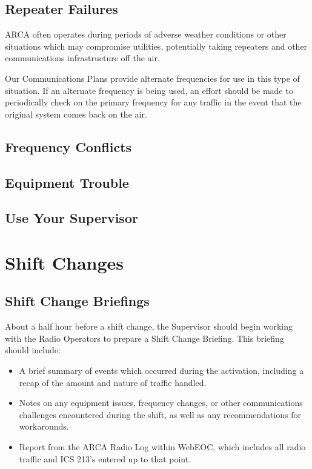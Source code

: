 \documentclass[pdflatex,letterpaper,twoside,12pt]{book}
\begin{document}
\subsection{Repeater Failures}

ARCA often operates during periods of adverse weather conditions or other situations which may compromise utilities, potentially taking repeaters and other communications infrastructure off the air.

Our Communications Plans provide alternate frequencies for use in this type of situation.  If an alternate frequency is being used, an effort should be made to periodically check on the primary frequency for any traffic in the event that the original system comes back on the air.

\subsection{Frequency Conflicts}


\subsection{Equipment Trouble}


\subsection{Use Your Supervisor}



\section{Shift Changes}

\subsection{Shift Change Briefings}

About a half hour before a shift change, the Supervisor should begin working with the Radio Operators to prepare a Shift Change Briefing.  This briefing should include:

\begin{itemize}
	\item A brief summary of events which occurred during the activation, including a recap of the amount and nature of traffic handled.
	\item Notes on any equipment issues, frequency changes, or other communications challenges encountered during the shift, as well as any recommendations for workarounds.
	\item Report from the ARCA Radio Log within WebEOC, which includes all radio traffic and ICS 213's entered up to that point.
\end{itemize}
\end{document}
